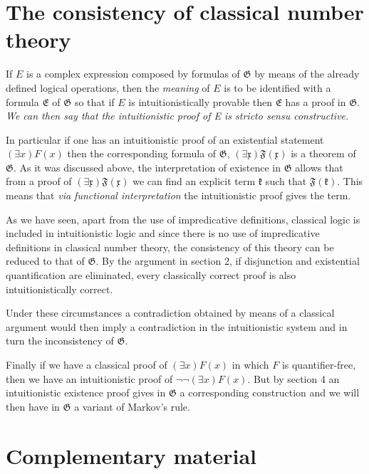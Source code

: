 \documentclass[12pt]{article}
\begin{document}
\section{The consistency of classical number theory}\normalsize

If $E$ is a complex expression composed by formulas of $\mathfrak{G}$ by means of the already defined logical operations, then the \emph{meaning} of $E$ is to be identified with a formula $\mathfrak{E}$ of $\mathfrak{G}$ so that if $E$ is intuitionistically provable then $\mathfrak{E}$ has a proof in $\mathfrak{G}$. \emph{We can then say that the intuitionistic proof of E is stricto sensu constructive.}

In particular if one has an intuitionistic proof of an existential statement $(\exists x) F (x)$ then the corresponding formula of $\mathfrak{G}$, $(\exists \mathfrak{x}) \mathfrak{F} (\mathfrak{x})$ is a theorem of $\mathfrak{G}$. As it was discussed above, the interpretation of existence in $\mathfrak{G}$ allows that from a proof of $(\exists \mathfrak{x}) \mathfrak{F} (\mathfrak{x})$ we can find an explicit term $\mathfrak{k}$ such that $\mathfrak{F} (\mathfrak{k})$. This means that \emph{via functional interpretation} the intuitionistic proof gives the term.

As we have seen, apart from the use of impredicative definitions, classical logic is included in intuitionistic logic and since there is no use of impredicative definitions in classical number theory, the consistency of this theory can be reduced to that of $\mathfrak{G}$. By the argument in section 2, if disjunction and existential quantification are eliminated, every classically correct proof is also intuitionistically correct.

Under these circumstances a contradiction obtained by means of a classical argument would then imply a contradiction in the intuitionistic system and in turn the inconsistency of $\mathfrak{G}$.

Finally if we have a classical proof of $(\exists x) F (x)$ in which $F$ is quantifier-free, then we have an intuitionistic proof of $\neg \neg (\exists x) F (x)$. But by section 4 an intuitionistic existence proof gives in $\mathfrak{G}$ a corresponding construction and we will then have in $\mathfrak{G}$ a variant of Markov's rule.

\section{Complementary material}\normalsize
\end{document}
